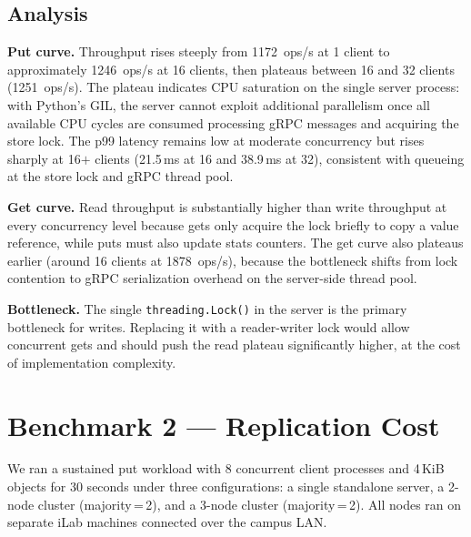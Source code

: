 \documentclass[11pt,letterpaper]{article}
\newcommand{\BOnePutOne}{1172}     %
\newcommand{\BOnePutSixteen}{1246} %
\newcommand{\BOnePutThirtytwo}{1251} %
\newcommand{\BOneGetSixteen}{1878}
\newcommand{\BOnePutPNNSixteen}{21.5}
\newcommand{\BOnePutPNNThirtytwo}{38.9}
\begin{document}
\subsection{Analysis}

\textbf{Put curve.}
Throughput rises steeply from \BOnePutOne\ ops/s at 1 client to approximately
\BOnePutSixteen\ ops/s at 16 clients, then plateaus between 16 and 32 clients
(\BOnePutThirtytwo\ ops/s).
The plateau indicates CPU saturation on the single server process: with
Python's GIL, the server cannot exploit additional parallelism once all
available CPU cycles are consumed processing gRPC messages and acquiring the
store lock.
The p99 latency remains low at moderate concurrency but rises sharply at
16$+$ clients (\BOnePutPNNSixteen\,ms at 16 and \BOnePutPNNThirtytwo\,ms at
32), consistent with queueing at the store lock and gRPC thread pool.

\textbf{Get curve.}
Read throughput is substantially higher than write throughput at every
concurrency level because gets only acquire the lock briefly to copy a value
reference, while puts must also update stats counters.
The get curve also plateaus earlier (around 16 clients at \BOneGetSixteen\
ops/s), because the bottleneck shifts from lock contention to gRPC
serialization overhead on the server-side thread pool.

\textbf{Bottleneck.}
The single \texttt{threading.Lock()} in the server is the primary bottleneck
for writes.
Replacing it with a reader-writer lock would allow concurrent gets and should
push the read plateau significantly higher, at the cost of implementation
complexity.


\section{Benchmark 2 — Replication Cost}

We ran a sustained put workload with 8 concurrent client processes and 4\,KiB
objects for 30 seconds under three configurations: a single standalone server,
a 2-node cluster (majority\,=\,2), and a 3-node cluster (majority\,=\,2).
All nodes ran on separate iLab machines connected over the campus LAN.

\vspace{6pt}
\end{document}
